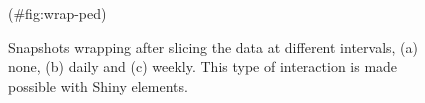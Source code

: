 \begin{Schunk}
\begin{figure}

{\centering {}\newline{}\newline{}

}

\caption[Snapshots wrapping after slicing the  data at different intervals, (a) none, (b) daily and (c) weekly]{Snapshots wrapping after slicing the  data at different intervals, (a) none, (b) daily and (c) weekly. This type of interaction is made possible with Shiny elements.}(\#fig:wrap-ped)
\end{figure}
\end{Schunk}

